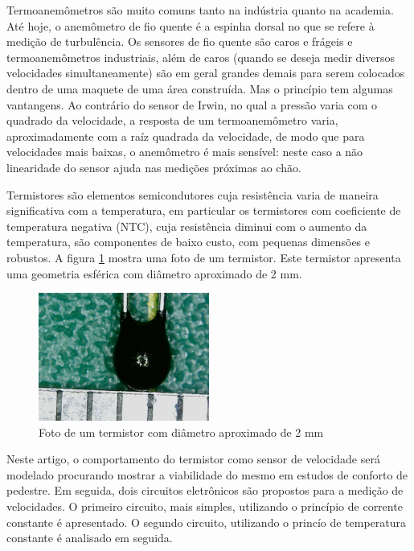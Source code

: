 \documentclass[10pt,fleqn,a4paper,twoside]{article}
\begin{document}
Termoanemômetros são muito comuns tanto na indústria quanto na academia. Até hoje, o anemômetro de fio quente é a espinha dorsal no que se refere à medição de turbulência. Os sensores de fio quente são caros e frágeis e termoanemômetros industriais, além de caros (quando se deseja medir diversos velocidades simultaneamente) são em geral grandes demais para serem colocados dentro de uma maquete de uma área construída. Mas o princípio tem algumas vantangens. Ao contrário do sensor de Irwin, no qual a pressão varia com o quadrado da velocidade, a resposta de um termoanemômetro varia, aproximadamente com a raíz quadrada da velocidade, de modo que para velocidades mais baixas, o anemômetro é mais sensível: neste caso a não linearidade do sensor ajuda nas medições próximas ao chão.

Termistores são elementos semicondutores cuja resistência varia de maneira significativa com a temperatura, em particular os termistores com coeficiente de temperatura negativa (NTC), cuja resistência diminui com o aumento da temperatura, são componentes de baixo custo, com pequenas dimensões e robustos. A figura \ref{fig:termistor} mostra uma foto de um termistor. Este termistor apresenta uma geometria esférica com diâmetro aproximado de 2 mm.

\begin{figure}[h!]
\centering
\includegraphics[width=0.5\textwidth]{../../figures/termistor.jpg}
\caption{Foto de um termistor com diâmetro aproximado de 2 mm}
\label{fig:termistor}
\end{figure}

Neste artigo, o comportamento do termistor como sensor de velocidade será modelado procurando mostrar a viabilidade do mesmo em estudos de conforto de pedestre. Em seguida, dois circuitos eletrônicos são propostos para a medição de velocidades. O primeiro circuito, mais simples, utilizando o princípio de corrente constante é apresentado. O segundo circuito, utilizando o princío de temperatura constante é analisado em seguida.
\end{document}
